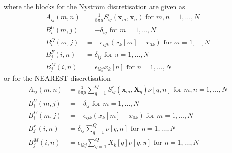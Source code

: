 where the blocks for the Nyström discretisation are given as
\begin{equation*}
\begin{aligned}
A_{ij}(m,n) &= \frac{1}{8\pi\mu} S_{ij}^\epsilon (\bm{x}_m,\bm{x}_{n}) \text { for } m,n = 1,\dots,N \\
B_{i}^{U}(m,j) &= -\delta_{ij} \text { for } m = 1,\dots,N \\
B_{i}^{\Omega}(m,j) &= -\epsilon_{ijk}(x_k[m]-x_{0k}) \text { for } m = 1,\dots,N \\
B_{j}^{F}(i,n) &= \delta_{ij} \text { for } n = 1,\dots,N \\
B_{j}^{M}(i,n) &= \epsilon_{ikj} x_k[n] \text { for } n = 1,\dots,N
\end{aligned}
\end{equation*}
or for the NEAREST discretisation
\begin{equation*}
\begin{aligned}
A_{ij}(m,n) &= \frac{1}{8\pi\mu} \sum_{q=1}^Q S_{ij}^\epsilon (\bm{x}_m,\bm{X}_{q})\nu[q,n] \text { for } m,n = 1,\dots,N \\
B_{i}^{U}(m,j) &= -\delta_{ij} \text { for } m = 1,\dots,N \\
B_{i}^{\Omega}(m,j) &= -\epsilon_{ijk}(x_k[m]-x_{0k}) \text { for } m = 1,\dots,N \\
B_{j}^{F}(i,n) &= \delta_{ij} \sum_{q=1}^Q \nu[q,n] \text { for } n = 1,\dots,N \\
B_{j}^{M}(i,n) &= \epsilon_{ikj} \sum_{q=1}^Q X_k[q] \nu[q,n] \text { for } n = 1,\dots,N
\end{aligned}
\end{equation*}

